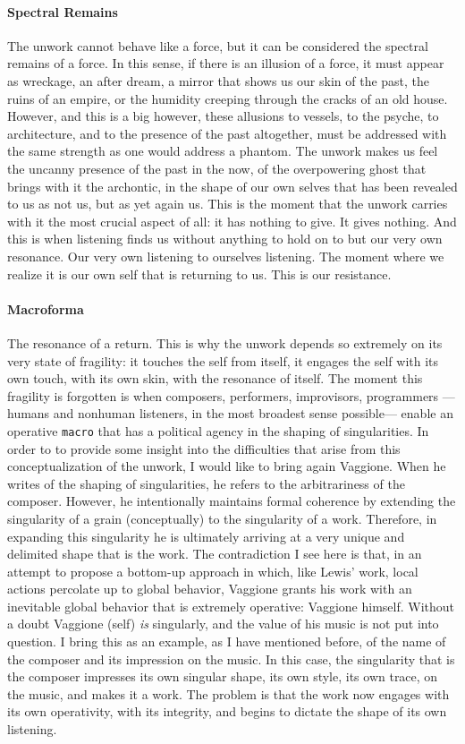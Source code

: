 \paragraph{Spectral Remains}
The unwork cannot behave like a force, but it can be considered the spectral remains of a force. In this sense, if there is an illusion of a force, it must appear as wreckage, an after dream, a mirror that shows us our skin of the past, the ruins of an empire, or the humidity creeping through the cracks of an old house. However, and this is a big however, these allusions to vessels, to the psyche, to architecture, and to the presence of the past altogether, must be addressed with the same strength as one would address a phantom. The unwork makes us feel the uncanny presence of the past in the now, of the overpowering ghost that brings with it the archontic, in the shape of our own selves that has been revealed to us as not us, but as yet again us. This is the moment that the unwork carries with it the most crucial aspect of all: it has nothing to give. It gives nothing. And this is when listening finds us without anything to hold on to but our very own resonance. Our very own listening to ourselves listening. The moment where we realize it is our own self that is returning to us. This is our resistance.

\paragraph{Macroforma}
The resonance of a return. This is why the unwork depends so extremely on its very state of fragility: it touches the self from itself, it engages the self with its own touch, with its own skin, with the resonance of itself. The moment this fragility is forgotten is when composers, performers, improvisors, programmers ---humans and nonhuman listeners, in the most broadest sense possible--- enable an operative \texttt{macro} that has a political agency in the shaping of singularities. In order to to provide some insight into the difficulties that arise from this conceptualization of the unwork, I would like to bring again Vaggione. When he writes of the shaping of singularities, he refers to the arbitrariness of the composer. However, he intentionally maintains formal coherence by extending the singularity of a grain (conceptually) to the singularity of a work. Therefore, in expanding this singularity he is ultimately arriving at a very unique and delimited shape that is the work. The contradiction I see here is that, in an attempt to propose a bottom-up approach in which, like Lewis' work, local actions percolate up to global behavior, Vaggione grants his work with an inevitable global behavior that is extremely operative: Vaggione himself. Without a doubt Vaggione (self) \textit{is} singularly, and the value of his music is not put into question. I bring this as an example, as I have mentioned before, of the name of the composer and its impression on the music. In this case, the singularity that is the composer impresses its own singular shape, its own style, its own trace, on the music, and makes it a work. The problem is that the work now engages with its own operativity, with its integrity, and begins to dictate the shape of its own listening.

